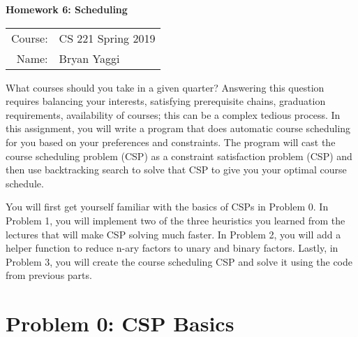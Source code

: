 \documentclass[10pt]{article}
\begin{document}
\begin{center}
{\Large \textbf{Homework 6: Scheduling}}

\begin{tabular}{rl}
\\
Course: & CS 221 Spring 2019 \\
Name: & Bryan Yaggi
\end{tabular}
\end{center}

What courses should you take in a given quarter? Answering this question requires balancing your interests, satisfying prerequisite chains, graduation requirements, availability of courses; this can be a complex tedious process. In this assignment, you will write a program that does automatic course scheduling for you based on your preferences and constraints. The program will cast the course scheduling problem (CSP) as a constraint satisfaction problem (CSP) and then use backtracking search to solve that CSP to give you your optimal course schedule.
\smallskip

You will first get yourself familiar with the basics of CSPs in Problem 0. In Problem 1, you will implement two of the three heuristics you learned from the lectures that will make CSP solving much faster. In Problem 2, you will add a helper function to reduce n-ary factors to unary and binary factors. Lastly, in Problem 3, you will create the course scheduling CSP and solve it using the code from previous parts. 

\section*{\normalsize Problem 0: CSP Basics}
\end{document}
